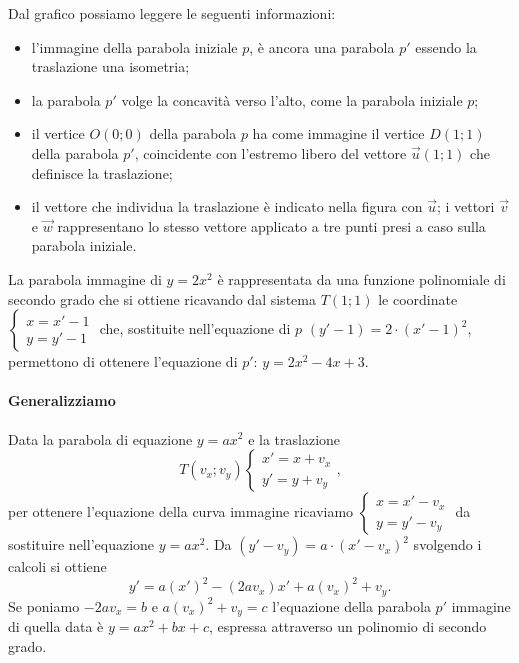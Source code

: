 \begin{center}
 
\end{center}
Dal grafico possiamo leggere le seguenti informazioni:
\begin{itemize}
\item l'immagine della parabola iniziale $p$, è ancora una parabola $p'$ essendo la traslazione una isometria;
\item la parabola $p'$ volge la concavità verso l'alto, come la parabola iniziale $p$;
\item il vertice $O(0;0)$ della parabola $p$ ha come immagine il vertice $D(1;1)$ della parabola $p'$, coincidente con l'estremo libero del vettore $\vec u(1;1)$ che definisce la traslazione;
\item il vettore che individua la traslazione è indicato nella figura con $\vec u$; i vettori $\vec v$ e $\vec w$ rappresentano lo stesso vettore applicato a tre punti presi a caso sulla parabola iniziale.
\end{itemize}
La parabola immagine di $y=2x^2$ è rappresentata da una funzione polinomiale di secondo grado che si ottiene ricavando dal sistema ${T}(1;1)$ le coordinate $\left\{\begin{array}{l}{x=x'-1}\\{y=y'-1}\end{array}\right.$ che, sostituite nell'equazione di $p$ $(y'-1)=2\cdot (x'-1)^2$, permettono di ottenere l'equazione di $p'$: $y=2x^2-4x+3$.

\paragraph{Generalizziamo}
Data la parabola di equazione $y=ax^2$ e la traslazione \[{T}(v_x;v_y)\left\{\begin{array}{l}{x'=x+v_x}\\{y'=y+v_y}\end{array}\right.\text{,}\] per ottenere l'equazione della curva immagine ricaviamo $\left\{\begin{array}{l}{x=x'-v_x}\\{y=y'-v_y}\end{array}\right.$ da sostituire nell'equazione $y={ax}^2$. Da $(y'-v_y)=a\cdot (x'-v_x)^2$ svolgendo i calcoli si ottiene \[y'=a(x')^2-(2av_x)x'+a(v_x)^2+v_y.\] Se poniamo $-2{av}_x=b$ e $a(v_x)^2+v_y=c$ l'equazione della parabola $p'$ immagine di quella data è $y={ax}^2+{bx}+c$, espressa attraverso un polinomio di secondo grado.
